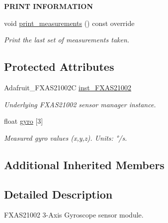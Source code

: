 \begin{Indent}{\bf P\+R\+I\+NT I\+N\+F\+O\+R\+M\+A\+T\+I\+ON}\par
\begin{DoxyCompactItemize}
\item 
void \hyperlink{class_loom___f_x_a_s21002_a9216501d392e712d886b4164a62cd7b0}{print\+\_\+measurements} () const override
\begin{DoxyCompactList}\small\item\em Print the last set of measurements taken. \end{DoxyCompactList}\end{DoxyCompactItemize}
\end{Indent}
\subsection*{Protected Attributes}
\begin{DoxyCompactItemize}
\item 
Adafruit\+\_\+\+F\+X\+A\+S21002C \hyperlink{class_loom___f_x_a_s21002_a2f7e11c7ae7894a1990beedf7894e9aa}{inst\+\_\+\+F\+X\+A\+S21002}
\begin{DoxyCompactList}\small\item\em Underlying F\+X\+A\+S21002 sensor manager instance. \end{DoxyCompactList}\item 
float \hyperlink{class_loom___f_x_a_s21002_a092bb83d142cf80a10ca907cacb75d4e}{gyro} \mbox{[}3\mbox{]}
\begin{DoxyCompactList}\small\item\em Measured gyro values (x,y,z). Units\+: °/s. \end{DoxyCompactList}\end{DoxyCompactItemize}
\subsection*{Additional Inherited Members}


\subsection{Detailed Description}
F\+X\+A\+S21002 3-\/\+Axis Gyroscope sensor module. 

